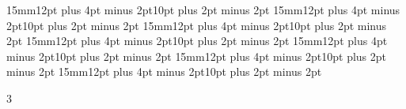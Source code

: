\titlespacing*{\sectionA}    {15mm}{12pt plus 4pt minus 2pt}{10pt plus 2pt minus 2pt} %
\titlespacing*{\sectionB}    {15mm}{12pt plus 4pt minus 2pt}{10pt plus 2pt minus 2pt} %
\titlespacing*{\sectionC}    {15mm}{12pt plus 4pt minus 2pt}{10pt plus 2pt minus 2pt} %
\titlespacing*{\sectionD}    {15mm}{12pt plus 4pt minus 2pt}{10pt plus 2pt minus 2pt} %
\titlespacing*{\sectionE}    {15mm}{12pt plus 4pt minus 2pt}{10pt plus 2pt minus 2pt} %
\titlespacing*{\sectionF}    {15mm}{12pt plus 4pt minus 2pt}{10pt plus 2pt minus 2pt} %
\titlespacing*{\paragraph}   {15mm}{12pt plus 4pt minus 2pt}{10pt plus 2pt minus 2pt} %

\def\toclevel@sectionA{1}
\def\toclevel@sectionB{2}
\def\toclevel@sectionC{3}
\def\toclevel@sectionD{4}
\def\toclevel@sectionE{5}
\def\toclevel@sectionF{6}
\def\toclevel@paragraph{7}
\def\toclevel@subparagraph{8}

\setcounter{secnumdepth}{6} %
\setcounter{tocdepth}   {3} %

\def\l@sectionA    {\@dottedtocline{1}{0em}{2em}}
\def\l@sectionB    {\@dottedtocline{2}{0em}{2em}}
\def\l@sectionC    {\@dottedtocline{3}{0em}{3em}}
\def\l@sectionD    {\@dottedtocline{4}{0em}{4em}}
\def\l@sectionE    {\@dottedtocline{5}{0em}{5em}}
\def\l@sectionF    {\@dottedtocline{6}{0em}{6em}}
\def\l@paragraph   {\@dottedtocline{7}{0em}{7em}}
\def\l@subparagraph{\@dottedtocline{8}{0em}{7em}}



